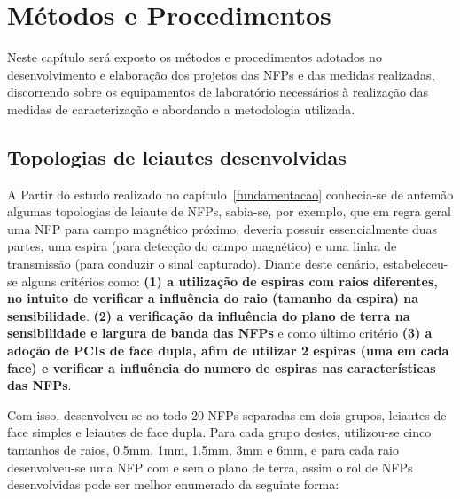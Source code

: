 \chapter{Métodos e Procedimentos}
Neste capítulo será exposto os métodos e procedimentos adotados no desenvolvimento e elaboração dos projetos das NFPs e das medidas realizadas, discorrendo sobre os equipamentos de laboratório necessários à realização das medidas de caracterização e abordando a metodologia utilizada.

\section{Topologias de leiautes desenvolvidas}
A Partir do estudo realizado no capítulo~\ref{fundamentacao} conhecia-se de antemão algumas topologias de leiaute de NFPs, sabia-se, por exemplo, que em regra geral uma NFP para campo magnético próximo, deveria possuir essencialmente duas partes, uma espira (para detecção do campo magnético) e uma linha de transmissão (para conduzir o sinal capturado). Diante deste cenário, estabeleceu-se alguns critérios como: \textbf{(1) a utilização de espiras com raios diferentes, no intuito de verificar a influência do raio (tamanho da espira) na sensibilidade}. \textbf{(2) a verificação da influência do plano de terra na sensibilidade e largura de banda das NFPs} e como último critério \textbf{(3) a adoção de PCIs de face dupla, afim de utilizar 2 espiras (uma em cada face) e verificar a influência do numero de espiras nas características das NFPs}.

Com isso, desenvolveu-se ao todo 20 NFPs separadas em dois grupos, leiautes de face simples e leiautes de face dupla. Para cada grupo destes, utilizou-se cinco tamanhos de raios, 0.5mm, 1mm, 1.5mm, 3mm e 6mm, e para cada raio desenvolveu-se uma NFP com e sem o plano de terra, assim o rol de NFPs desenvolvidas pode ser melhor enumerado da seguinte forma:

